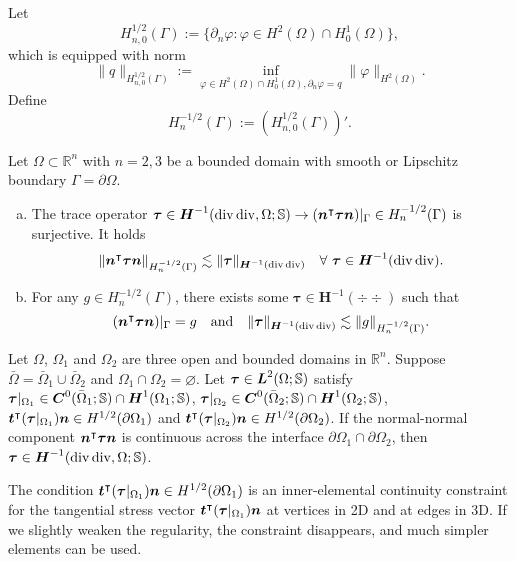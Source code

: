 Let
\[
H_{n,0}^{1/2}(\Gamma):=\{\partial_{n}\varphi: \varphi\in H^2(\Omega)\cap H_0^1(\Omega)\},
\]
which is equipped with norm
\[
\|q\|_{H_{n,0}^{1/2}(\Gamma)}:=\inf_{\varphi\in H^2(\Omega)\cap H_0^1(\Omega), \partial_{n}\varphi=q}\|\varphi\|_{H^2(\Omega)}.
\]
Define
\[
H_{n}^{-1/2}(\Gamma):=\left(H_{n,0}^{1/2}(\Gamma)\right)'.
\]
\begin{lemma}
Let $\Omega\subset\mathbb R^n$ with $n=2,3$ be a bounded domain with smooth or Lipschitz boundary
$\Gamma=\partial\Omega$.
\begin{enumerate}[(a)]
\item The trace operator $\boldsymbol\tau\in\boldsymbol{H}^{-1}(\operatorname{div}\operatorname{div},\Omega; \mathbb{S})\to (\boldsymbol{n}^{\intercal}\boldsymbol\tau\boldsymbol{n})|_{\Gamma}\in H_{n}^{-1/2}(\Gamma)$ is surjective.
It holds
\[
\|\boldsymbol{n}^{\intercal}\boldsymbol\tau\boldsymbol{n}\|_{H_{n}^{-1/2}(\Gamma)}\lesssim \|\boldsymbol\tau\|_{\boldsymbol{H}^{-1}(\operatorname{div}\operatorname{div})}\quad\forall~\boldsymbol\tau\in\boldsymbol{H}^{-1}(\operatorname{div}\operatorname{div}).
\]
\item For any $g\in H_{n}^{-1/2}(\Gamma)$, there exists some $\boldsymbol\tau\in\boldsymbol{H}^{-1}(\div\div)$ such that
\[
(\boldsymbol{n}^{\intercal}\boldsymbol\tau\boldsymbol{n})|_{\Gamma}=g\quad\textrm{and}\quad \|\boldsymbol\tau\|_{\boldsymbol{H}^{-1}(\operatorname{div}\operatorname{div})}\lesssim \|g\|_{H_{n}^{-1/2}(\Gamma)}.
\]
\end{enumerate}
\end{lemma}


\begin{lemma}\label{lem:Hdivdivcontinuous}
Let $\Omega$, $\Omega_1$ and $\Omega_2$ are three open and bounded domains in $\mathbb R^n$. Suppose
$\bar{\Omega}=\bar{\Omega}_1\cup \bar{\Omega}_2$ and $\Omega_1\cap \Omega_2=\varnothing$. Let $\boldsymbol\tau\in \boldsymbol L^2(\Omega;\mathbb S)$ satisfy $\boldsymbol\tau|_{\Omega_1}\in \boldsymbol{C}^{0}(\bar{\Omega}_1;\mathbb S)\cap \boldsymbol{H}^1(\Omega_1;\mathbb S)$, $\boldsymbol\tau|_{\Omega_2}\in \boldsymbol{C}^{0}(\bar{\Omega}_2;\mathbb S)\cap \boldsymbol{H}^1(\Omega_2;\mathbb S)$, $\boldsymbol{t}^{\intercal}(\boldsymbol\tau|_{\Omega_1})\boldsymbol{n}\in H^{1/2}(\partial\Omega_1)$ and $\boldsymbol{t}^{\intercal}(\boldsymbol\tau|_{\Omega_2})\boldsymbol{n}\in H^{1/2}(\partial\Omega_2)$.
If the normal-normal component $\boldsymbol{n}^{\intercal}\boldsymbol\tau\boldsymbol{n}$ is continuous across the interface $\partial\Omega_1\cap\partial\Omega_2$, then $\boldsymbol\tau\in \boldsymbol{H}^{-1}(\operatorname{div}\operatorname{div},\Omega; \mathbb{S})$.
\end{lemma}
\begin{remark}
The condition $\boldsymbol{t}^{\intercal}(\boldsymbol\tau|_{\Omega_1})\boldsymbol{n}\in H^{1/2}(\partial\Omega_1)$ is an inner-elemental continuity
constraint for the tangential stress vector $\boldsymbol{t}^{\intercal}(\boldsymbol\tau|_{\Omega_1})\boldsymbol{n}$ at vertices in 2D and at edges in 3D.
If we slightly weaken the regularity, the constraint disappears, and much simpler
elements can be used.
\end{remark}

